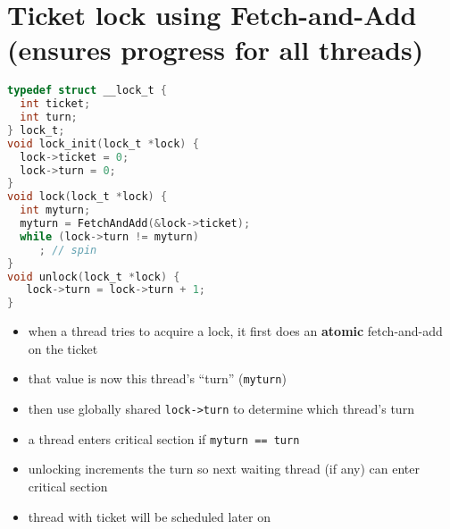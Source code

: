 \section*{Ticket lock using Fetch-and-Add (ensures progress for all threads)}
\begin{minipage}{.55\linewidth}
\begin{lstlisting}[language=c]
typedef struct __lock_t {
  int ticket;
  int turn;
} lock_t;
void lock_init(lock_t *lock) {
  lock->ticket = 0;
  lock->turn = 0;
}
void lock(lock_t *lock) {
  int myturn;
  myturn = FetchAndAdd(&lock->ticket);
  while (lock->turn != myturn)
     ; // spin
}
void unlock(lock_t *lock) {
   lock->turn = lock->turn + 1;
}
\end{lstlisting}
\end{minipage}
\begin{minipage}{.45\linewidth}
  \flushleft
  \begin{itemize}
  \item when a thread tries to acquire a lock, it first does an \textbf{atomic} fetch-and-add on the ticket
  \item that value is now this thread's ``turn'' (\texttt{myturn})
  \item then use globally shared \texttt{lock->turn} to determine which thread's turn
  \item a thread enters critical section if \texttt{myturn == turn}
  \item unlocking increments the turn so next waiting thread (if any) can enter critical section
  \item thread with ticket will be scheduled later on
  \end{itemize}
\end{minipage}
